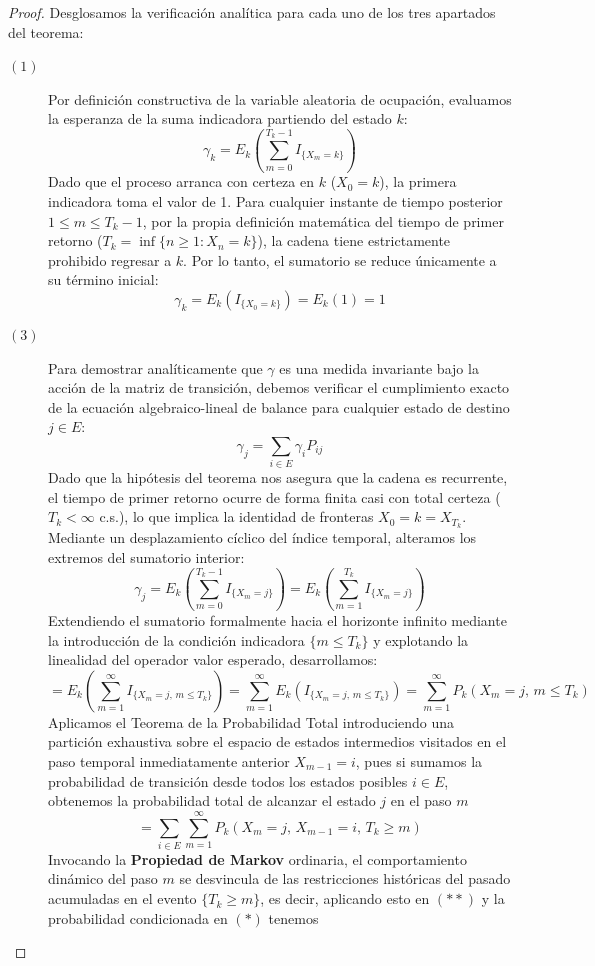 \documentclass[10pt]{book}
\begin{document}
\begin{teo}
\begin{proof}
    Desglosamos la verificación analítica para cada uno de los tres apartados del teorema:
    \begin{description}
        \item[$(1)$] Por definición constructiva de la variable aleatoria de ocupación, evaluamos la esperanza de la suma indicadora partiendo del estado $k$:
            \[ 
            \gamma_k = E_k \left( \sum_{m=0}^{T_k - 1} I_{\{X_m = k\}} \right) 
            \]
            Dado que el proceso arranca con certeza en $k$ ($X_0 = k$), la primera indicadora toma el valor de 1. Para cualquier instante de tiempo posterior $1 \leq m \leq T_k - 1$, por la propia definición matemática del tiempo de primer retorno ($T_k = \inf\{n \geq 1 : X_n = k\}$), la cadena tiene estrictamente prohibido regresar a $k$. Por lo tanto, el sumatorio se reduce únicamente a su término inicial:
            \[
            \gamma_k = E_k(I_{\{X_0 = k\}}) = E_k(1) = 1
            \]
        \item[$(3)$] Para demostrar analíticamente que $\gamma$ es una medida invariante bajo la acción de la matriz de transición, debemos verificar el cumplimiento exacto de la ecuación algebraico-lineal de balance para cualquier estado de destino $j \in E$:
            \[
            \gamma_j = \sum_{i \in E} \gamma_i P_{ij}
            \]
            Dado que la hipótesis del teorema nos asegura que la cadena es recurrente, el tiempo de primer retorno ocurre de forma finita casi con total certeza ($T_k < \infty$ c.s.), lo que implica la identidad de fronteras $X_0 = k = X_{T_k}$. Mediante un desplazamiento cíclico del índice temporal, alteramos los extremos del sumatorio interior:
            \[
            \gamma_j = E_k \left( \sum_{m=0}^{T_k - 1} I_{\{X_m = j\}} \right) 
            = E_k \left( \sum_{m=1}^{T_k} I_{\{X_m = j\}} \right) 
            \]
            Extendiendo el sumatorio formalmente hacia el horizonte infinito mediante la introducción de la condición indicadora $\{m \leq T_k\}$ y explotando la linealidad del operador valor esperado, desarrollamos:
            \[
            = E_k \left( \sum_{m=1}^{\infty} I_{\{X_m = j, \, m \leq T_k\}} \right) 
            = \sum_{m=1}^{\infty} E_k \left( I_{\{X_m = j, \, m \leq T_k\}} \right) 
            = \sum_{m=1}^{\infty} P_k (X_m = j, \, m \leq T_k)
            \]
            Aplicamos el Teorema de la Probabilidad Total introduciendo una partición exhaustiva sobre el espacio de estados intermedios visitados en el paso temporal inmediatamente anterior $X_{m-1} = i$, pues si sumamos la probabilidad de transición desde todos los estados posibles $i \in E$, obtenemos la probabilidad total de alcanzar el estado $j$ en el paso $m$
            \[
            = \sum_{i \in E} \sum_{m=1}^{\infty} P_k (X_m = j, \, X_{m-1} = i, \, T_k \geq m)
            \]
            Invocando la \textbf{Propiedad de Markov} ordinaria, el comportamiento dinámico del paso $m$ se desvincula de las restricciones históricas del pasado acumuladas en el evento $\{T_k \geq m\}$, es decir, aplicando esto en $(**)$ y la probabilidad condicionada en $(*)$ tenemos


\end{description}
\end{proof}
\end{teo}
\end{document}

